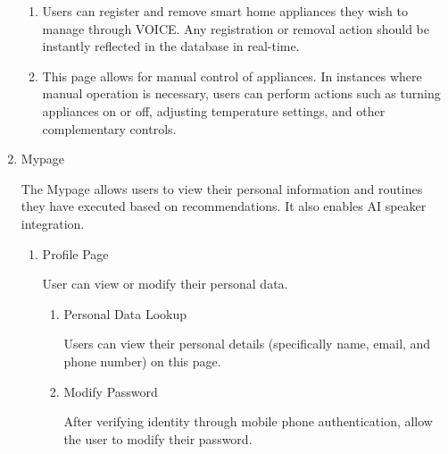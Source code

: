 \documentclass[conference]{IEEEtran}
\begin{document}
\begin{enumerate}[label=\arabic*]
    \begin{enumerate}[label=\arabic*)]
        \item Users can register and remove smart home appliances they wish to manage through VOICE. Any registration or removal action should be instantly reflected in the database in real-time.

        \vspace{0.5em}

        \item This page allows for manual control of appliances. In instances where manual operation is necessary, users can perform actions such as turning appliances on or off, adjusting temperature settings, and other complementary controls.
    \end{enumerate}

    \vspace{1em}

    \item Mypage\par
    \vspace{0.3em}
    The Mypage allows users to view their personal information and routines they have executed based on recommendations. It also enables AI speaker integration.
    \vspace{0.3em}

    \begin{enumerate}[label=\arabic*)]
        \item Profile Page\par
        \vspace{0.3em}
        User can view or modify their personal data.
        \vspace{0.3em}

        \begin{enumerate}[label=\alph*)]
            \item Personal Data Lookup\par
            \vspace{0.3em}
            Users can view their personal details (specifically name, email, and phone number) on this page.

            \vspace{0.5em}

            \item Modify Password\par
            \vspace{0.3em}
            After verifying identity through mobile phone authentication, allow the user to modify their password.
        \end{enumerate}


\end{enumerate}
\end{enumerate}
\end{document}
